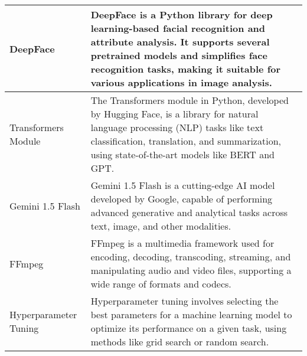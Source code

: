 \begin{center}
\begin{tabular}{|p{4cm}|p{10cm}|}
  \hline
  DeepFace & DeepFace is a Python library for deep learning-based facial recognition and attribute analysis. It supports several pretrained models and simplifies face recognition tasks, making it suitable for various applications in image analysis. \\

  \hline
  Transformers Module & The Transformers module in Python, developed by Hugging Face, is a library for natural language processing (NLP) tasks like text classification, translation, and summarization, using state-of-the-art models like BERT and GPT. \\

  \hline
  Gemini 1.5 Flash & Gemini 1.5 Flash is a cutting-edge AI model developed by Google, capable of performing advanced generative and analytical tasks across text, image, and other modalities. \\

  \hline
  FFmpeg & FFmpeg is a multimedia framework used for encoding, decoding, transcoding, streaming, and manipulating audio and video files, supporting a wide range of formats and codecs. \\

  \hline
  Hyperparameter Tuning & Hyperparameter tuning involves selecting the best parameters for a machine learning model to optimize its performance on a given task, using methods like grid search or random search. \\
  \hline
\end{tabular}
  
\end{center}


